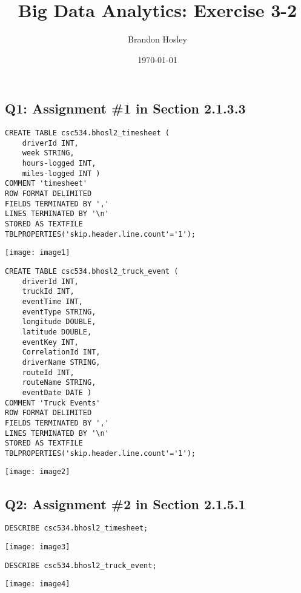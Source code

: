 \documentclass[]{article}
\title{Big Data Analytics: Exercise 3-2}
\author{Brandon Hosley}
\date{\today}
\begin{document}
\maketitle

\subsection*{Q1: Assignment \#1 in Section 2.1.3.3} 

\begin{verbatim}
CREATE TABLE csc534.bhosl2_timesheet ( 
	driverId INT, 
	week STRING, 
	hours-logged INT, 
	miles-logged INT ) 
COMMENT 'timesheet' 
ROW FORMAT DELIMITED 
FIELDS TERMINATED BY ',' 
LINES TERMINATED BY '\n' 
STORED AS TEXTFILE 
TBLPROPERTIES('skip.header.line.count'='1');
\end{verbatim}
\texttt{[image: image1]} %

\begin{verbatim}
CREATE TABLE csc534.bhosl2_truck_event ( 
	driverId INT,
	truckId INT,
	eventTime INT,
	eventType STRING,
	longitude DOUBLE, 
	latitude DOUBLE, 
	eventKey INT, 
	CorrelationId INT, 
	driverName STRING, 
	routeId INT, 
	routeName STRING, 
	eventDate DATE ) 
COMMENT 'Truck Events' 
ROW FORMAT DELIMITED 
FIELDS TERMINATED BY ',' 
LINES TERMINATED BY '\n' 
STORED AS TEXTFILE 
TBLPROPERTIES('skip.header.line.count'='1');
\end{verbatim}
\texttt{[image: image2]} %

\subsection*{Q2: Assignment \#2 in Section 2.1.5.1} 

\begin{verbatim}
DESCRIBE csc534.bhosl2_timesheet;
\end{verbatim}
\texttt{[image: image3]} %

\begin{verbatim}
DESCRIBE csc534.bhosl2_truck_event;
\end{verbatim}
\texttt{[image: image4]} %
\end{document}
